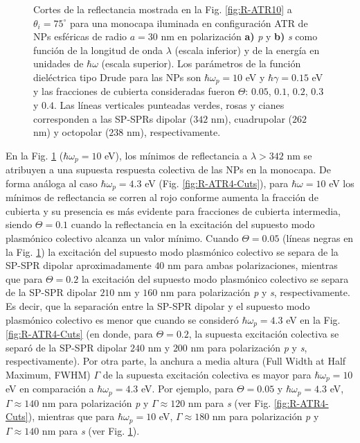 \begin{figure}[h!]
	\caption{Cortes de la reflectancia mostrada en la Fig. \ref{fig:R-ATR10} a $\theta_i = 75^\circ$ para una monocapa iluminada en configuración ATR de NPs esféricas de radio $a=30$ nm en polarización \textbf{a)} \emph{p} y \textbf{b)} \emph{s} como función de la longitud de onda $\lambda$ (escala inferior) y de la energía en unidades de $\hbar\omega$ (escala superior). Los parámetros de la función dieléctrica tipo Drude para las NPs son $\hbar\omega_p = 10$ eV y $\hbar\gamma = 0.15$ eV y las fracciones de cubierta consideradas fueron $\Theta$: $0. 05$, $0. 1$, $0. 2$, $0. 3$ y $0. 4$. Las líneas verticales punteadas verdes, rosas y cianes corresponden a las SP-SPRs dipolar ($342$ nm), cuadrupolar ($262$ nm) y octopolar ($238$ nm), respectivamente.  }\label{fig:R-ATR10-Cuts}
	\end{figure}	

En la Fig. \ref{fig:R-ATR10-Cuts} ($\hbar\omega_p=10$ eV), los mínimos de reflectancia a $\lambda > 342$ nm se atribuyen a una supuesta respuesta colectiva de las NPs en la monocapa. De forma análoga al caso $\hbar\omega_p = 4.3$ eV (Fig. \ref{fig:R-ATR4-Cuts}), para $\hbar\omega=10$ eV los mínimos de reflectancia se corren al rojo conforme aumenta la fracción de cubierta y su presencia es más evidente para fracciones de cubierta intermedia, siendo  $\Theta=0.1$ cuando la reflectancia en la excitación del supuesto modo plasmónico colectivo alcanza un valor mínimo. Cuando $\Theta = 0.05$ (líneas negras en la Fig. \ref{fig:R-ATR10-Cuts}) la excitación del supuesto modo plasmónico colectivo se separa de la SP-SPR dipolar  aproximadamente $40$ nm para ambas polarizaciones, mientras que para $\Theta = 0.2$ la excitación del supuesto modo plasmónico colectivo se separa de la SP-SPR dipolar  $210$ nm y $160$ nm para polarización \emph{p} y \emph{s}, respectivamente. Es decir, que la separación entre la SP-SPR dipolar y el supuesto modo plasmónico colectivo es menor que cuando se consideró $\hbar\omega_p = 4.3$ eV en la Fig. \ref{fig:R-ATR4-Cuts} (en donde, para $\Theta=0.2$, la supuesta excitación colectiva se separó de la SP-SPR dipolar $240$ nm y $200$ nm para polarización \emph{p} y \emph{s}, respectivamente). Por otra parte, la anchura a media altura (Full Width at Half Maximum, FWHM) $\Gamma$ de la supuesta excitación colectiva es mayor para $\hbar\omega_p=10$ eV en comparación a $\hbar\omega_p=4.3$ eV. Por ejemplo, para $\Theta = 0.05$ y $\hbar\omega_p = 4.3$ eV,  $\Gamma\approx 140$ nm para polarización \emph{p} y  $\Gamma\approx 120$ nm para  \emph{s} (ver Fig. \ref{fig:R-ATR4-Cuts}), mientras que para  $\hbar\omega_p = 10$ eV,  $\Gamma\approx 180$ nm para polarización \emph{p} y  $\Gamma\approx 140$ nm para  \emph{s} (ver Fig. \ref{fig:R-ATR10-Cuts}).

